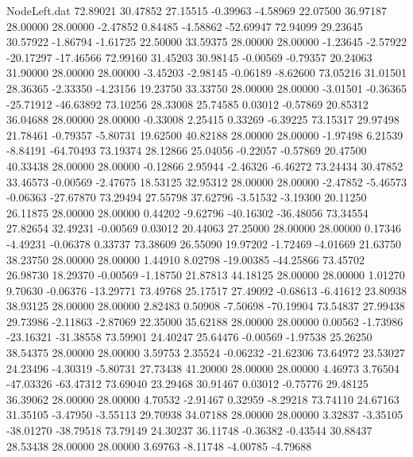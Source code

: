 \begin{filecontents}{NodeLeft.dat}
  72.89021   30.47852   27.15515    -0.39963   -4.58969   22.07500   36.97187   28.00000   28.00000   -2.47852    0.84485   -4.58862  -52.69947
  72.94099   29.23645   30.57922    -1.86794   -1.61725   22.50000   33.59375   28.00000   28.00000   -1.23645   -2.57922  -20.17297  -17.46566
  72.99160   31.45203   30.98145    -0.00569   -0.79357   20.24063   31.90000   28.00000   28.00000   -3.45203   -2.98145   -0.06189   -8.62600
  73.05216   31.01501   28.36365    -2.33350   -4.23156   19.23750   33.33750   28.00000   28.00000   -3.01501   -0.36365  -25.71912  -46.63892
  73.10256   28.33008   25.74585     0.03012   -0.57869   20.85312   36.04688   28.00000   28.00000   -0.33008    2.25415    0.33269   -6.39225
  73.15317   29.97498   21.78461    -0.79357   -5.80731   19.62500   40.82188   28.00000   28.00000   -1.97498    6.21539   -8.84191  -64.70493
  73.19374   28.12866   25.04056    -0.22057   -0.57869   20.47500   40.33438   28.00000   28.00000   -0.12866    2.95944   -2.46326   -6.46272
  73.24434   30.47852   33.46573    -0.00569   -2.47675   18.53125   32.95312   28.00000   28.00000   -2.47852   -5.46573   -0.06363  -27.67870
  73.29494   27.55798   37.62796    -3.51532   -3.19300   20.11250   26.11875   28.00000   28.00000    0.44202   -9.62796  -40.16302  -36.48056
  73.34554   27.82654   32.49231    -0.00569    0.03012   20.44063   27.25000   28.00000   28.00000    0.17346   -4.49231   -0.06378    0.33737
  73.38609   26.55090   19.97202    -1.72469   -4.01669   21.63750   38.23750   28.00000   28.00000    1.44910    8.02798  -19.00385  -44.25866
  73.45702   26.98730   18.29370    -0.00569   -1.18750   21.87813   44.18125   28.00000   28.00000    1.01270    9.70630   -0.06376  -13.29771
  73.49768   25.17517   27.49092    -0.68613   -6.41612   23.80938   38.93125   28.00000   28.00000    2.82483    0.50908   -7.50698  -70.19904
  73.54837   27.99438   29.73986    -2.11863   -2.87069   22.35000   35.62188   28.00000   28.00000    0.00562   -1.73986  -23.16321  -31.38558
  73.59901   24.40247   25.64476    -0.00569   -1.97538   25.26250   38.54375   28.00000   28.00000    3.59753    2.35524   -0.06232  -21.62306
  73.64972   23.53027   24.23496    -4.30319   -5.80731   27.73438   41.20000   28.00000   28.00000    4.46973    3.76504  -47.03326  -63.47312
  73.69040   23.29468   30.91467     0.03012   -0.75776   29.48125   36.39062   28.00000   28.00000    4.70532   -2.91467    0.32959   -8.29218
  73.74110   24.67163   31.35105    -3.47950   -3.55113   29.70938   34.07188   28.00000   28.00000    3.32837   -3.35105  -38.01270  -38.79518
  73.79149   24.30237   36.11748    -0.36382   -0.43544   30.88437   28.53438   28.00000   28.00000    3.69763   -8.11748   -4.00785   -4.79688

\end{filecontents}

